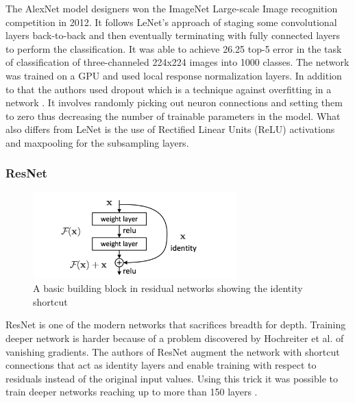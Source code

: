 The AlexNet \cite{alexnet} model designers won the ImageNet Large-scale Image recognition competition in 2012. It follows LeNet’s approach of staging some convolutional layers back-to-back and then eventually terminating with fully connected layers to perform the classification. It was able to achieve 26.25 top-5 error in the task of classification of three-channeled 224x224 images into 1000 classes. The network was trained on a GPU \cite{alexnet} and used local response normalization layers. In addition to that the authors used dropout which is a technique against overfitting in a network \cite{dropout}. It involves randomly picking out neuron connections and setting them to zero thus decreasing the number of trainable parameters in the model. What also differs from LeNet is the use of Rectified Linear Units (ReLU) activations and maxpooling \cite{alexnet} for the subsampling layers.

\subsubsection{ResNet}

\begin{figure}[h!]
\centering
\includegraphics[width=0.7\textwidth]{Figures/residual}
\caption[Residual Learning]{ A basic building block in residual networks showing the identity shortcut  \cite{resnet}}
\label{fig:Residual Learning Basic Block}
\end{figure}

ResNet \cite{resnet} is one of the modern networks that sacrifices breadth for depth. Training deeper network is harder because of a problem discovered by Hochreiter et al. \cite{hochreiter1998vanishing} of vanishing gradients.  The authors of ResNet augment the network with shortcut connections that act as identity layers and enable training with respect to residuals instead of the original input values. Using this trick it was possible to train deeper networks reaching up to more than 150 layers \cite{resnet}. 

